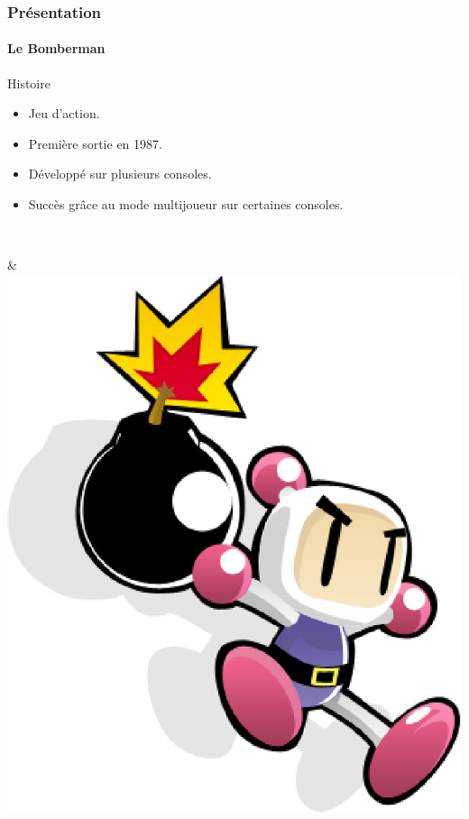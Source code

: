 \begin{frame}
\frametitle{Présentation}
\framesubtitle{Le Bomberman}
\begin{minipage}{7cm}
Histoire
	\begin{itemize}
		\item Jeu d'action.
		\item Première sortie en 1987.
		\item Développé sur plusieurs consoles.
		\item Succès grâce au mode multijoueur sur certaines consoles.
	\end{itemize} \\
\end{minipage} & \includegraphics[scale=0.3]{img/bomberman1.eps} 

\end{frame}




